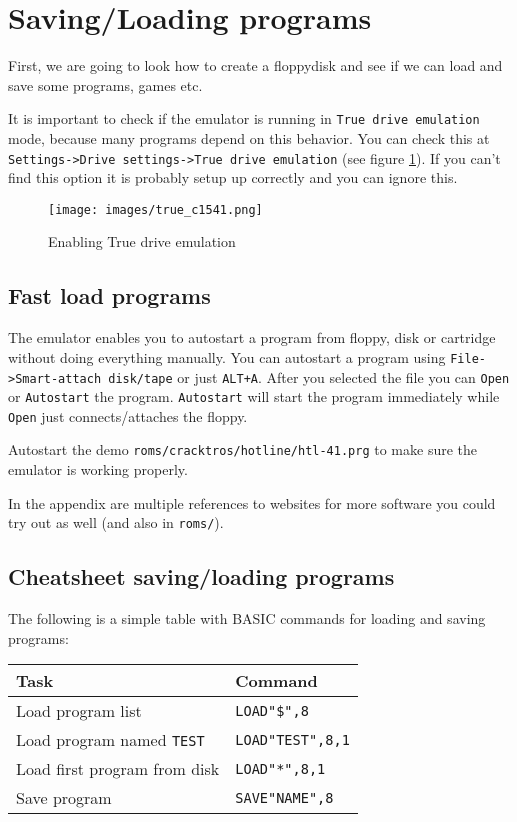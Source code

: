 \section{Saving/Loading programs}

First, we are going to look how to create a floppydisk and see if we can load and save some programs, games etc.

It is important to check if the emulator is running in \verb:True drive emulation: mode, because many programs depend on this behavior.
You can check this at \verb:Settings->Drive settings->True drive emulation: (see figure \ref{fig:true_c1541}).
If you can't find this option it is probably setup up correctly and you can ignore this.

\begin{figure}
\centering
\texttt{[image: images/true\_c1541.png]}
\caption{Enabling True drive emulation}
\label{fig:true_c1541}
\end{figure}

\subsection{Fast load programs}

The emulator enables you to autostart a program from floppy, disk or cartridge without doing everything manually.
You can autostart a program using \verb:File->Smart-attach disk/tape: or just \verb:ALT+A:.
After you selected the file you can \verb:Open: or \verb:Autostart: the program.
\verb:Autostart: will start the program immediately while \verb:Open: just connects/attaches the floppy.

\problem Autostart the demo \verb:roms/cracktros/hotline/htl-41.prg: to make sure the emulator is working properly.

In the appendix are multiple references to websites for more software you could try out as well (and also in \verb:roms/:).

\subsection{Cheatsheet saving/loading programs}

The following is a simple table with BASIC commands for loading and saving programs:

\begin{tabular}{l|l}
Task & Command \\ \hline
Load program list & \verb:LOAD"$",8: \\
Load program named \verb:TEST: & \verb:LOAD"TEST",8,1: \\
Load first program from disk & \verb:LOAD"*",8,1: \\
Save program & \verb:SAVE"NAME",8:
\end{tabular}

